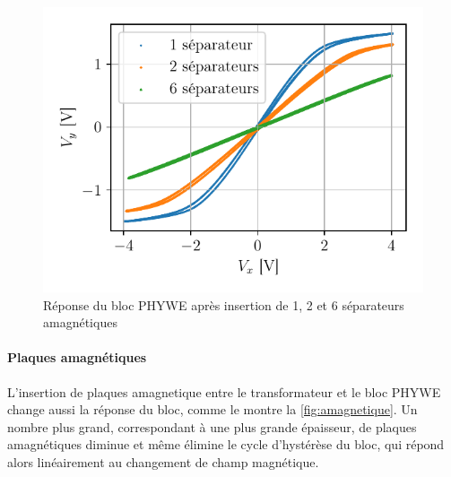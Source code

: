 \begin{figure}
    \centering
    \includegraphics[width=\linewidth]{figures/separateurs_amagnetique.pdf}
    \caption{Réponse du bloc PHYWE après insertion de 1, 2 et 6 séparateurs amagnétiques}
    \label{fig:amagnetique}
\end{figure}

\paragraph{Plaques amagnétiques}
L'insertion de plaques amagnetique entre le transformateur et le bloc PHYWE change aussi la réponse du bloc, comme le montre la \autoref{fig:amagnetique}. Un nombre plus grand, correspondant à une plus grande épaisseur, de plaques amagnétiques diminue et même élimine le cycle d'hystérèse du bloc, qui répond alors linéairement au changement de champ magnétique.


